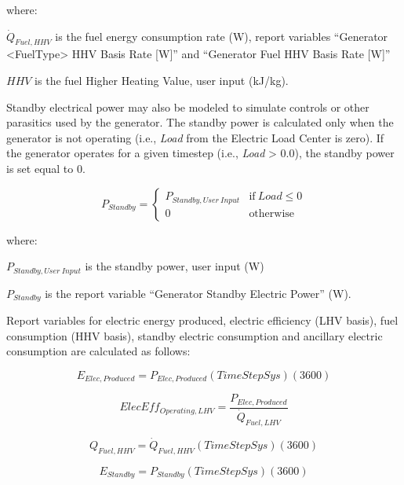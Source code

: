 where:

\({\dot Q_{Fuel,HHV}}\) is the fuel energy consumption rate (W), report variables ``Generator \textless{}FuelType\textgreater{} HHV Basis Rate {[}W{]}'' and ``Generator Fuel HHV Basis Rate {[}W{]}''

\(HHV\) is the fuel Higher Heating Value, user input (kJ/kg).

Standby electrical power may also be modeled to simulate controls or other parasitics used by the generator. The standby power is calculated only when the generator is not operating (i.e., \emph{Load} from the Electric Load Center is zero). If the generator operates for a given timestep (i.e., \emph{Load} \textgreater{} 0.0), the standby power is set equal to 0.

\begin{equation}
P_{Standby} = \left\{
  \begin{array}{cl}
    P_{Standby,User~Input} &\text{if}~Load \leq 0 \\
    0                     &\text{otherwise}
  \end{array}
\right.
\end{equation}

where:

\({P_{Standby,User~Input}}\) is the standby power, user input (W)

\({P_{Standby}}\) is the report variable ``Generator Standby Electric Power'' (W).

Report variables for electric energy produced, electric efficiency (LHV basis), fuel consumption (HHV basis), standby electric consumption and ancillary electric consumption are calculated as follows:

\begin{equation}
{E_{Elec,Produced}} = {P_{Elec,Produced}}\left( {TimeStepSys} \right)\left( {3600} \right)
\end{equation}

\begin{equation}
ElecEff_{Operating,LHV} = \frac{P_{Elec,Produced}}{\dot{Q}_{Fuel,LHV}}
\end{equation}

\begin{equation}
{Q_{Fuel,HHV}} = {\dot Q_{Fuel,HHV}}\left( {TimeStepSys} \right)\left( {3600} \right)
\end{equation}

\begin{equation}
{E_{Standby}} = {P_{Standby}}\left( {TimeStepSys} \right)\left( {3600} \right)
\end{equation}

